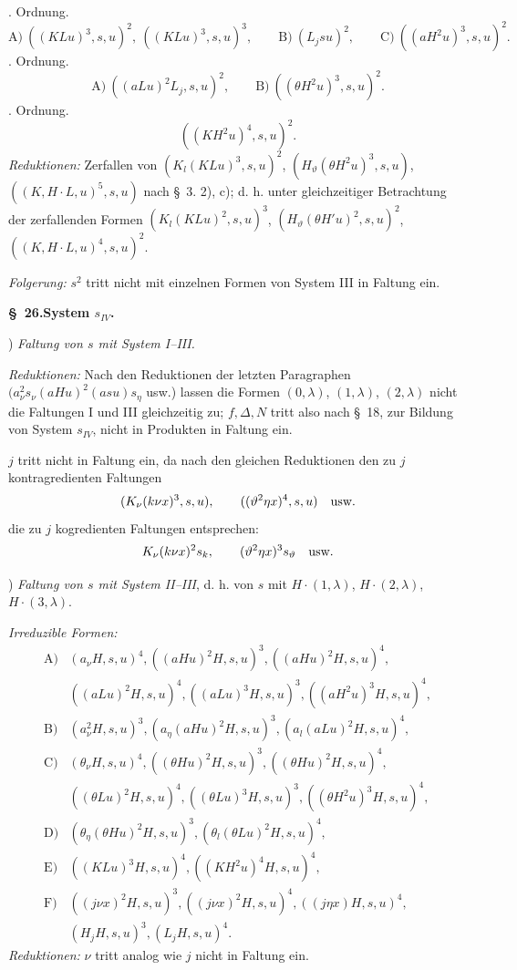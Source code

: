 \documentclass[11pt]{article}
\newcommand{\D}{\Delta}
\begin{document}
. Ordnung.
\[
\text{A)}\ ((KLu)^3,s,u)^2,\ ((KLu)^3,s,u)^3,\qquad
\text{B)}\ (L_jsu)^2,
\qquad
\text{C)}\ ((aH^2u)^3,s,u)^2.
\]
. Ordnung.
\[
\text{A)}\ ((aLu)^2L_j,s,u)^2,
\qquad
\text{B)}\ ((\theta H^2u)^3,s,u)^2.
\]
. Ordnung.
\[
 ((KH^2u)^4,s,u)^2.
\]
\noindent\emph{Reduktionen:} Zerfallen von $(K_l(KLu)^3,s,u)^2$, $(H_\vartheta(\theta H^2u)^3,s,u)$, $((K,H\cdot L,u)^5,s,u)$ nach \S\ 3. 2), c); d. h. unter gleichzeitiger Betrachtung der zerfallenden Formen $(K_l(KLu)^2,s,u)^3$, $(H_\vartheta(\theta H'u)^2,s,u)^2$, $((K,H\cdot L,u)^4,s,u)^2$.

\noindent\emph{Folgerung:} $s^2$ tritt nicht mit einzelnen Formen von System III in Faltung ein.

\begin{center}\textbf{\S\ 26.\quad System $s_{IV}$.}\end{center}
) \emph{Faltung von $s$ mit System I--III.}

\noindent\emph{Reduktionen:} Nach den Reduktionen der letzten Paragraphen $(a_\nu^2s_\nu(aHu)^2(asu)s_\eta$ usw.) lassen die Formen $(0,\lambda)$, $(1,\lambda)$, $(2,\lambda)$ nicht die Faltungen I und III gleichzeitig zu; $f,\D,N$ tritt also nach \S\ 18, zur Bildung von System $s_{IV}$, nicht in Produkten in Faltung ein.

$j$ tritt nicht in Faltung ein, da nach den gleichen Reduktionen den zu $j$ kontragredienten Faltungen
\[
(K_\nu(k\nu x)^3,s,u),\qquad ((\vartheta^2\eta x)^4,s,u)\quad\hbox{usw.}
\]
die zu $j$ kogredienten Faltungen entsprechen:
\[
K_\nu(k\nu x)^2s_k,
\qquad (\vartheta^2\eta x)^3s_\vartheta\quad\hbox{usw.}
\]

) \emph{Faltung von $s$ mit System II--III}, d. h. von $s$ mit $H\cdot(1,\lambda)$, $H\cdot(2,\lambda)$, $H\cdot(3,\lambda)$.

\noindent\emph{Irreduzible Formen:}
\[
\begin{array}{rl}
\text{A)}&(a_\nu H,s,u)^4,
((aHu)^2H,s,u)^3,
((aHu)^2H,s,u)^4,\\
&((aLu)^2H,s,u)^4,
((aLu)^3H,s,u)^3,
((aH^2u)^3H,s,u)^4,\\[0.3em]
\text{B)}&(a_\nu^2H,s,u)^3,
(a_\eta(aHu)^2H,s,u)^3,
(a_l(aLu)^2H,s,u)^4,\\[0.3em]
\text{C)}&(\theta_\nu H,s,u)^4,
((\theta Hu)^2H,s,u)^3,
((\theta Hu)^2H,s,u)^4,\\
&((\theta Lu)^2H,s,u)^4,
((\theta Lu)^3H,s,u)^3,
((\theta H^2u)^3H,s,u)^4,\\[0.3em]
\text{D)}&(\theta_\eta(\theta Hu)^2H,s,u)^3,
(\theta_l(\theta Lu)^2H,s,u)^4,\\[0.3em]
\text{E)}&((KLu)^3H,s,u)^4,
((KH^2u)^4H,s,u)^4,\\[0.3em]
\text{F)}&((j\nu x)^2H,s,u)^3,
((j\nu x)^2H,s,u)^4,
((j\eta x)H,s,u)^4,\\
&(H_jH,s,u)^3,
(L_jH,s,u)^4.
\end{array}
\]
\noindent\emph{Reduktionen:} $\nu$ tritt analog wie $j$ nicht in Faltung ein.
\end{document}
